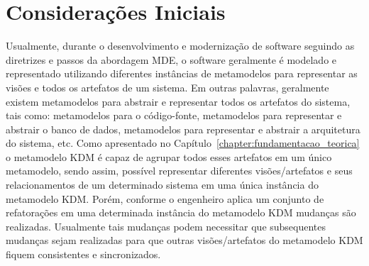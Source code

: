 \section{Considerações Iniciais}

Usualmente, durante o desenvolvimento e modernização de software seguindo as diretrizes e passos da abordagem MDE, o software geralmente é modelado e representado utilizando diferentes instâncias de metamodelos para representar as visões e todos os artefatos de um sistema. Em outras palavras, geralmente existem metamodelos para abstrair e representar todos os artefatos do sistema, tais como: metamodelos para o código-fonte, metamodelos para representar e abstrair o banco de dados, metamodelos para representar e abstrair a arquitetura do sistema, etc. Como apresentado no Capítulo~\ref{chapter:fundamentacao_teorica} o metamodelo KDM é capaz de agrupar todos esses artefatos em um único metamodelo, sendo assim, possível representar diferentes visões/artefatos e seus relacionamentos de um determinado sistema em uma única instância do metamodelo KDM. Porém, conforme o engenheiro aplica um conjunto de refatorações em uma determinada instância do metamodelo KDM mudanças são realizadas. Usualmente tais mudanças podem necessitar que subsequentes mudanças sejam realizadas para que outras visões/artefatos do metamodelo KDM fiquem consistentes e sincronizados.

